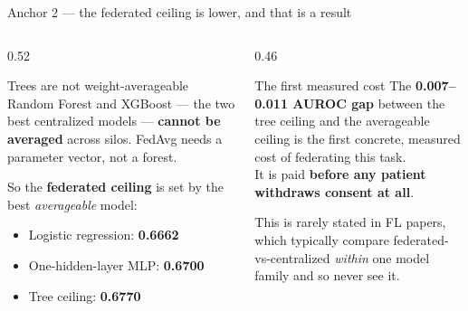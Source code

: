 \documentclass[aspectratio=169, 11pt]{beamer}
\begin{document}
\begin{frame}{Anchor 2 --- the federated ceiling is lower, and that is a result}
\begin{columns}[T]
\begin{column}{0.52\textwidth}
\begin{alertblock}{Trees are not weight-averageable}
Random Forest and XGBoost --- the two best centralized models --- \textbf{cannot
be averaged} across silos. FedAvg needs a parameter vector, not a forest.
\end{alertblock}
\vspace{0.5em}
So the \textbf{federated ceiling} is set by the best \emph{averageable} model:
\begin{itemize}\small
\item Logistic regression: \textbf{0.6662}
\item One-hidden-layer MLP: \textbf{0.6700}
\item Tree ceiling: \textbf{0.6770}
\end{itemize}
\end{column}
\begin{column}{0.46\textwidth}
\begin{exampleblock}{The first measured cost}
The \textbf{0.007--0.011 AUROC gap} between the tree ceiling and the
averageable ceiling is the first concrete, measured cost of federating this
task.\\[0.5em]
It is paid \textbf{before any patient withdraws consent at all}.
\end{exampleblock}
\vspace{0.3em}
{\footnotesize This is rarely stated in FL papers, which typically compare
federated-vs-centralized \emph{within} one model family and so never see it.}
\end{column}
\end{columns}
\end{frame}
\end{document}

